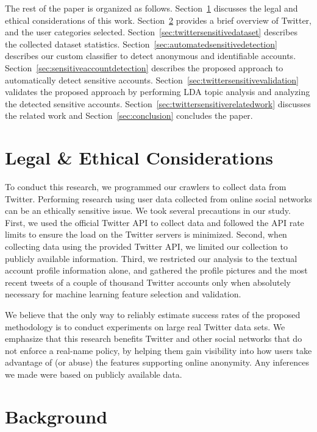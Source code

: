 \documentclass[conference]{IEEEtran}
\begin{document}
The rest of the paper is organized as follows.
Section~\ref{sec:ethicalconsiderations} discusses the legal and ethical considerations of this work.
Section~\ref{sec:twittersensitivebackground} provides a brief overview of Twitter, and the user categories selected. Section~\ref{sec:twittersensitivedataset} describes the collected dataset statistics. Section~\ref{sec:automatedsensitivedetection} describes our custom classifier to detect anonymous and identifiable accounts. Section~\ref{sec:sensitiveaccountdetection} describes the proposed approach to automatically detect sensitive accounts. Section~\ref{sec:twittersensitivevalidation} validates the proposed approach by performing LDA topic analysis and analyzing the detected sensitive accounts. 
Section~\ref{sec:twittersensitiverelatedwork} discusses the related work and Section~\ref{sec:conclusion} concludes the paper.


\section{Legal \& Ethical Considerations}
\label{sec:ethicalconsiderations}
To conduct this research, we programmed our crawlers to collect data from Twitter. Performing research using user data collected from online social networks can be an ethically sensitive issue. We took several precautions in our study. First, we used the official Twitter API to collect data and followed the API rate limits to ensure the load on the Twitter servers is minimized.  
Second, when collecting data using the provided Twitter API, we limited our collection to publicly available information. 
Third, we restricted our analysis to the textual account profile information alone, and gathered the profile pictures and the most recent tweets of a couple of thousand Twitter accounts 
only when absolutely necessary for machine learning feature selection and validation.

We believe that the only way to reliably estimate success rates of the proposed methodology is to conduct experiments on large real Twitter data sets. We emphasize that this research benefits Twitter and other social networks that do not enforce a real-name policy, by helping them gain visibility into how users take advantage of (or abuse) the features supporting online anonymity. Any inferences we made were based on publicly available data.


\section{Background}
\label{sec:twittersensitivebackground}
\end{document}
